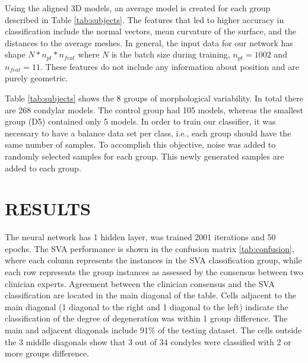 \documentclass[]{spie}  %
\begin{document}
Using the aligned 3D models, an average model is created for each group described in Table \ref{tab:subjects}.
The features that led to higher accuracy in classification include 
the normal vectors, mean curvature of the surface, and the distances to the average meshes. 
In general, the input data for our network has shape  $N * n_{pt} * n_{feat}$ where $N$ is the batch size during training, 
$n_{pt} = 1002$ and $n_{feat} = 11$. These features do not include any information about position and are purely geometric.

Table \ref{tab:subjects} shows the 8 groups of morphological variability. In total there are 268 condylar models. 
The control group had 105 models, whereas the smallest group (D5) contained only 5 models. 
In order to train our classifier, it was necessary to have a balance data set per class, i.e., each group should have 
the same number of samples. To accomplish this objective, noise was added to randomly selected samples for each group. 
This newly generated samples are added to each group. 

\section{RESULTS}

The neural network has 1 hidden layer, was trained 2001 iterations and 50 epochs. 
The SVA  performance is  shown in the confusion matrix \ref{tab:confusion}, 
where each column represents the instances in the SVA classification group,
while each row represents the group instances as assessed by the consensus between two clinician experts. Agreement between the clinician consensus and the SVA classification are located in the main diagonal of the table. 
Cells adjacent to the main diagonal (1 diagonal 
to the right and 1 diagonal to the left) indicate the classification of the degree of degeneration was within 1 group difference. The main and adjacent diagonals include 91\% of the testing dataset. 
The cells outside the 3 middle diagonals show that 3 out of 34 condyles were classified with 2 or more groups difference. 
\end{document}
